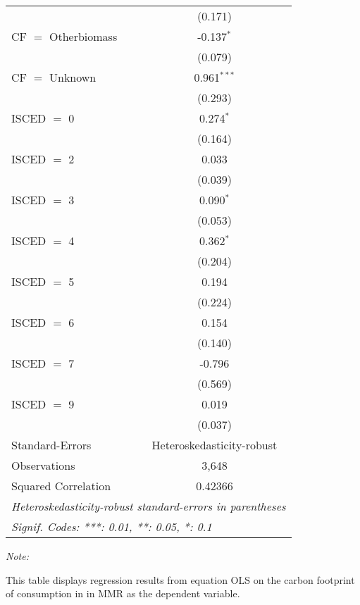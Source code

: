 \begin{table}[htbp!]
\begin{adjustbox}{width = 1\textwidth, max height = 0.95\textheight, center}
\begin{threeparttable}[b]
\begin{tabular}{lc}
                                & (0.171)\\   
            CF $=$ Otherbiomass & -0.137$^{*}$\\   
                                & (0.079)\\   
            CF $=$ Unknown      & 0.961$^{***}$\\   
                                & (0.293)\\   
            ISCED $=$ 0         & 0.274$^{*}$\\   
                                & (0.164)\\   
            ISCED $=$ 2         & 0.033\\   
                                & (0.039)\\   
            ISCED $=$ 3         & 0.090$^{*}$\\   
                                & (0.053)\\   
            ISCED $=$ 4         & 0.362$^{*}$\\   
                                & (0.204)\\   
            ISCED $=$ 5         & 0.194\\   
                                & (0.224)\\   
            ISCED $=$ 6         & 0.154\\   
                                & (0.140)\\   
            ISCED $=$ 7         & -0.796\\   
                                & (0.569)\\   
            ISCED $=$ 9         & 0.019\\   
                                & (0.037)\\   
            \midrule 
            Standard-Errors     & Heteroskedasticity-robust \\   
            Observations        & 3,648\\  
            Squared Correlation & 0.42366\\  
            \midrule \midrule
            \multicolumn{2}{l}{\emph{Heteroskedasticity-robust standard-errors in parentheses}}\\
            \multicolumn{2}{l}{\emph{Signif. Codes: ***: 0.01, **: 0.05, *: 0.1}}\\
         \end{tabular}
         
         \begin{tablenotes}\item \medskip \textit{Note:}
            \item This table displays regression results from equation OLS on the carbon footprint of consumption in  in MMR as the dependent variable.  
         \end{tablenotes}
      \end{threeparttable}
   \end{adjustbox}
\end{table}


